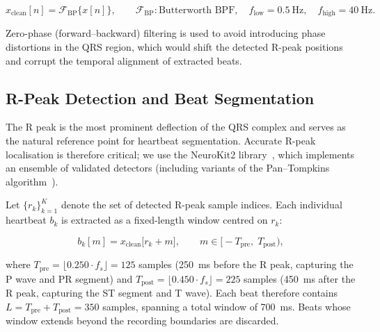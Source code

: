 \documentclass[12pt, a4paper]{article}
\begin{document}
\begin{mathbox}
\begin{equation}
  x_{\text{clean}}[n]
  = \mathcal{F}_{\text{BP}}\bigl\{x[n]\bigr\},
  \qquad
  \mathcal{F}_{\text{BP}} : \text{Butterworth BPF},
  \quad f_{\text{low}} = 0.5~\text{Hz},
  \quad f_{\text{high}} = 40~\text{Hz}.
  \label{eq:bandpass}
\end{equation}
\end{mathbox}

Zero-phase (forward--backward) filtering is used to avoid introducing
phase distortions in the QRS region, which would shift the detected R-peak
positions and corrupt the temporal alignment of extracted beats.

\subsection{R-Peak Detection and Beat Segmentation}

The R peak is the most prominent deflection of the QRS complex and serves
as the natural reference point for heartbeat segmentation.
Accurate R-peak localisation is therefore critical; we use the
NeuroKit2 library~\cite{makowski2021}, which implements an ensemble of
validated detectors (including variants of the Pan--Tompkins
algorithm~\cite{pan1985}).

Let $\{r_k\}_{k=1}^{K}$ denote the set of detected R-peak sample indices.
Each individual heartbeat $b_k$ is extracted as a fixed-length window
centred on $r_k$:

\begin{mathbox}
\begin{equation}
  b_k[m] = x_{\text{clean}}\bigl[r_k + m\bigr],
  \qquad
  m \in \bigl[-T_{\text{pre}},\; T_{\text{post}}\bigr),
  \label{eq:beat_window}
\end{equation}
\end{mathbox}

\noindent where $T_{\text{pre}} = \lfloor 0.250 \cdot f_s \rfloor = 125$
samples (250~ms before the R peak, capturing the P wave and PR segment)
and $T_{\text{post}} = \lfloor 0.450 \cdot f_s \rfloor = 225$ samples
(450~ms after the R peak, capturing the ST segment and T wave).
Each beat therefore contains $L = T_{\text{pre}} + T_{\text{post}} = 350$
samples, spanning a total window of 700~ms.
Beats whose window extends beyond the recording boundaries are discarded.

\end{document}
